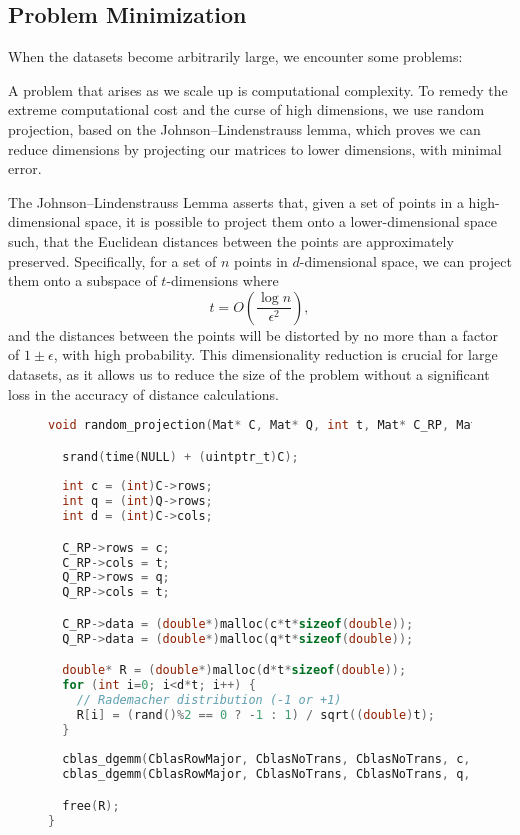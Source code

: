 \documentclass{article}
\begin{document}
\subsection{Problem Minimization}

When the datasets become arbitrarily large, we encounter some problems:

A problem that arises as we scale up is computational complexity. To remedy the extreme computational cost and the curse of high dimensions, we use random projection, based on the Johnson–Lindenstrauss lemma, which proves we can reduce dimensions by projecting our matrices to lower dimensions, with minimal error.

The Johnson–Lindenstrauss Lemma asserts that, given a set of points in a high-dimensional space, it is possible to project them onto a lower-dimensional space such, that the Euclidean distances between the points are approximately preserved. Specifically, for a set of \( n \) points in \( d \)-dimensional space, we can project them onto a subspace of \( t \)-dimensions where 
\[
t = O\left(\frac{\log n}{\epsilon^2}\right),
\]
and the distances between the points will be distorted by no more than a factor of \( 1 \pm \epsilon \), with high probability. This dimensionality reduction is crucial for large datasets, as it allows us to reduce the size of the problem without a significant loss in the accuracy of distance calculations.


\begin{figure}[H]
\begin{lstlisting}[language=C, caption={Routine for applying Random Projection}]
void random_projection(Mat* C, Mat* Q, int t, Mat* C_RP, Mat* Q_RP) {

  srand(time(NULL) + (uintptr_t)C);
  
  int c = (int)C->rows;
  int q = (int)Q->rows;
  int d = (int)C->cols;

  C_RP->rows = c;
  C_RP->cols = t;
  Q_RP->rows = q;
  Q_RP->cols = t;

  C_RP->data = (double*)malloc(c*t*sizeof(double));
  Q_RP->data = (double*)malloc(q*t*sizeof(double));

  double* R = (double*)malloc(d*t*sizeof(double));
  for (int i=0; i<d*t; i++) {
    // Rademacher distribution (-1 or +1)
    R[i] = (rand()%2 == 0 ? -1 : 1) / sqrt((double)t);
  }
  
  cblas_dgemm(CblasRowMajor, CblasNoTrans, CblasNoTrans, c, t, d, 1.0, C->data, d, R, t, 0.0, C_RP->data, t);
  cblas_dgemm(CblasRowMajor, CblasNoTrans, CblasNoTrans, q, t, d, 1.0, Q->data, d, R, t, 0.0, Q_RP->data, t);

  free(R);
}
\end{lstlisting}
\end{figure}
\end{document}
